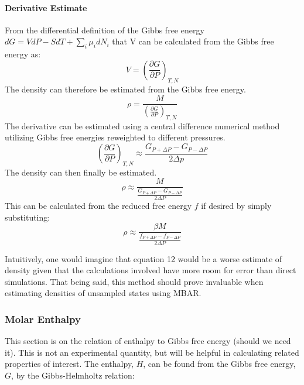 \documentclass[9pt,bestpractices]{livecoms}
\begin{document}
\paragraph{Derivative Estimate}
 From the differential definition of the Gibbs free energy $dG = VdP -SdT + \sum_i \mu_i dN_i$ that V can be calculated from the Gibbs free energy as:
\begin{equation} V = \left( \frac{\partial G}{\partial P} \right)_{T,N} \end{equation}
 The density can therefore be estimated from the Gibbs free energy.
\begin{equation} \rho = \frac{M}{ \left( \frac{\partial G}{\partial P} \right)_{T,N}} \end{equation}
 The derivative can be estimated using a central difference numerical method utilizing Gibbs free energies reweighted to different pressures.
\begin{equation} \left( \frac{\partial G}{\partial P} \right)_{T,N} \approx \frac{G_{P + \Delta P} - G_{P-\Delta P}}{2\Delta p} \end{equation}
 The density can then finally be estimated.
\begin{equation} \rho \approx \frac{M}{\frac{G_{P + \Delta P} - G_{P-\Delta P}}{2\Delta P}} \end{equation}
This can be calculated from the reduced free energy $f$ if desired by simply substituting:
\begin{equation} \rho \approx \frac{\beta M}{\frac{f_{P + \Delta P} - f_{P-\Delta P}}{2\Delta P}} \end{equation}

Intuitively, one would imagine that equation 12 would be a worse estimate of density given that the calculations involved have more room for error than direct simulations. That being said, this method should prove invaluable when estimating densities of unsampled states using MBAR. 


\subsubsection{Molar Enthalpy}
This section is on the relation of enthalpy to Gibbs free energy (should we need it). This is not an experimental quantity, but will be helpful in calculating related properties of interest. The enthalpy, $H$, can be found from the Gibbs free energy, $G$, by the Gibbs-Helmholtz relation: 
\end{document}
